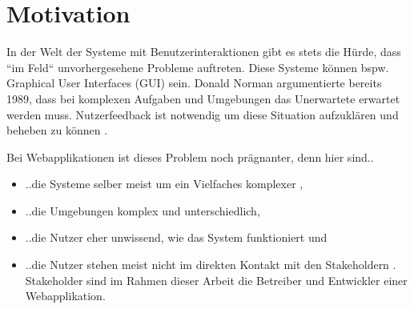 \section{Motivation}

In der Welt der Systeme mit Benutzerinteraktionen gibt es stets die Hürde, dass ``im Feld`` unvorhergesehene Probleme auftreten. Diese Systeme können bspw. Graphical User Interfaces (GUI) sein. Donald Norman \cite{TheProblemOfAutomation} argumentierte bereits 1989, dass bei komplexen Aufgaben und Umgebungen das Unerwartete erwartet werden muss. Nutzerfeedback ist notwendig um diese Situation aufzuklären und beheben zu können \cite{AnErrorReportingAndFeedbackComponent}.

Bei Webapplikationen ist dieses Problem noch prägnanter, denn hier sind..
\begin{itemize}
	\item ..die Systeme selber meist um ein Vielfaches komplexer \cite{ManagingTheComplexityOfWebSystemsDevelopment},
	\item ..die Umgebungen komplex und unterschiedlich,
	\item ..die Nutzer eher unwissend, wie das System funktioniert \cite{AnErrorReportingAndFeedbackComponent} und
	\item ..die Nutzer stehen meist nicht im direkten Kontakt mit den Stakeholdern \cite{EndUsersAsUnwittingSoftwareDevelopers}. Stakeholder sind im Rahmen dieser Arbeit die Betreiber und Entwickler einer Webapplikation.
\end{itemize}

